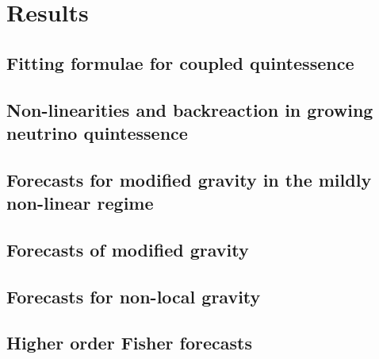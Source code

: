 \chapter{Results} %

\label{Resus} %




\section{Fitting formulae for coupled quintessence }


\section{Non-linearities and backreaction in growing neutrino quintessence}


\section{Forecasts for modified gravity in the mildly non-linear regime}


\section{Forecasts of modified gravity}

\section{Forecasts for non-local gravity}

\section{Higher order Fisher forecasts}